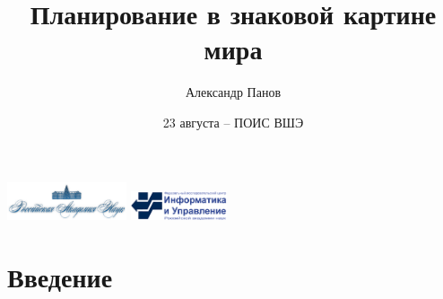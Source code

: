 \documentclass[default]{beamer}
\begin{document}
	
	\title[Планирование в знаковой КМ]{Планирование в знаковой картине мира}
	\author[Панов]{Александр Панов}
	\date{23 августа -- ПОИС ВШЭ} 
	
	\begin{frame}
		\titlepage
		\centering
		\includegraphics[width=100pt]{advert/ras.png} \hspace{10pt}
		\includegraphics[width=80pt]{advert/frccsc.png}
	\end{frame}
	
	\section{Введение}
\end{document}
